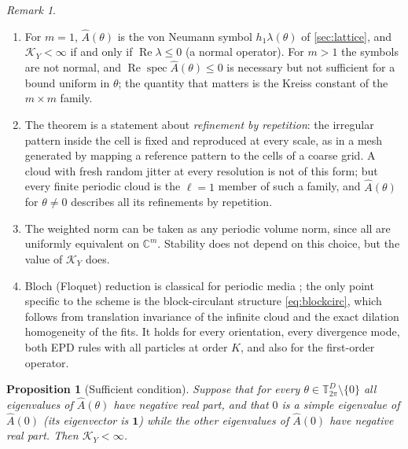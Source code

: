 \documentclass[11pt,a4paper]{article}
\theoremstyle{plain}
\newtheorem{proposition}[theorem]{Proposition}
\theoremstyle{definition}
\theoremstyle{remark}
\newtheorem{remark}[theorem]{Remark}
\numberwithin{equation}{section}
\newcommand{\C}{\mathbb{C}}
\newcommand{\T}{\mathbb{T}}
\renewcommand{\Re}{\operatorname{Re}}
\newcommand{\spec}{\operatorname{spec}}
\begin{document}
\begin{remark}\label{rem:bloch}
\begin{enumerate}[label=(\roman*)]
\item For $m=1$, $\hat A(\theta)$ is the von Neumann symbol $h_1\lambda(\theta)$ of \cref{sec:lattice}, and $\mathcal K_Y<\infty$ if and only if $\Re\lambda\le0$ (a normal operator). For $m>1$ the symbols are not normal, and $\Re\spec\hat A(\theta)\le0$ is necessary but not sufficient for a bound uniform in $\theta$; the quantity that matters is the Kreiss constant of the $m\times m$ family.
\item The theorem is a statement about \emph{refinement by repetition}: the irregular pattern inside the cell is fixed and reproduced at every scale, as in a mesh generated by mapping a reference pattern to the cells of a coarse grid. A cloud with fresh random jitter at every resolution is not of this form; but every finite periodic cloud is the $\ell=1$ member of such a family, and $\hat A(\theta)$ for $\theta\ne0$ describes all its refinements by repetition.
\item The weighted norm can be taken as any periodic volume norm, since all are uniformly equivalent on $\C^m$. Stability does not depend on this choice, but the value of $\mathcal K_Y$ does.
\item Bloch (Floquet) reduction is classical for periodic media \cite{Kuchment1993}; the only point specific to the scheme is the block-circulant structure \eqref{eq:blockcirc}, which follows from translation invariance of the infinite cloud and the exact dilation homogeneity of the fits. It holds for every orientation, every divergence mode, both EPD rules with all particles at order $K$, and also for the first-order operator.
\end{enumerate}
\end{remark}

\begin{proposition}[Sufficient condition]\label{prop:blochsuff}
Suppose that for every $\theta\in\T^D_{2\pi}\setminus\{0\}$ all eigenvalues of $\hat A(\theta)$ have negative real part, and that $0$ is a simple eigenvalue of $\hat A(0)$ (its eigenvector is $\mathbf 1$) while the other eigenvalues of $\hat A(0)$ have negative real part. Then $\mathcal K_Y<\infty$.
\end{proposition}
\end{document}
